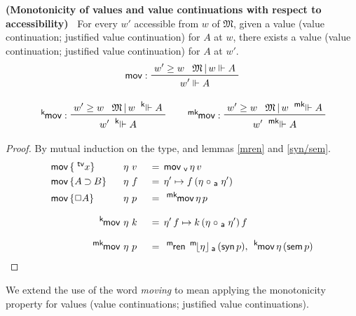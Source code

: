 \documentclass{entcs}
\numberwithin{equation}{thm}
\newcommand{\tsf}[1]{\textsf{\upshape{#1}}}
\newcommand{\stsf}[1]{\tsf{\small{#1}}}
\renewcommand{\:}{\mathrel{:}}
\newcommand{\tyrule}[1]{\prftree[l]{${#1} \:\,$}}
\newcommand{\0}{\varnothing}
\newcommand{\tvar}{\operatorname{^{\stsf{tv}\mkern-4mu}}}
\newcommand{\imp}{\mathbin{\supset}}
\newcommand{\sq}{\Box}
\newcommand{\mren}{\operatorname{^{\stsf{m}\mkern-2mu}\tsf{ren}}}
\newcommand{\M}{\mathfrak{M}}
\newcommand{\compa}{\mathrel{\circ_{\stsf{a}}}}
\newcommand{\movv}{\operatorname{\tsf{mov}_{\stsf{v}}}}
\newcommand{\mpeeka}[1]{\mathopen{^{\stsf{m}\mkern-3mu}\lfloor}{#1}\mathclose{\rfloor_{\mkern-2mu\stsf{a}}}}
\newcommand{\ee}{\mathrel{\Vdash}}
\newcommand{\kee}{\mathrel{^{\stsf{k}\mkern-6mu}\Vdash}}
\newcommand{\mkee}{\mathrel{^{\stsf{mk}\mkern-6mu}\Vdash}}
\newcommand{\syn}{\operatorname{\tsf{syn}}}
\newcommand{\sem}{\operatorname{\tsf{sem}}}
\newcommand{\mov}{\operatorname{\tsf{mov}}}
\newcommand{\kmov}{\operatorname{^{\stsf{k}\mkern-2mu}\tsf{mov}}}
\newcommand{\mkmov}{\operatorname{^{\stsf{mk}\mkern-2mu}\tsf{mov}}}
\begin{document}
\begin{lemma}
  \normalshape
  \textbf{(Monotonicity of values and value continuations with respect to accessibility)\ }
  \label{mov/kmov/mkmov}
  For every $w'$ accessible from $w$ of $\M$, given a value (value continuation; justified value continuation) for $A$ at $w$, there exists a value (value continuation; justified value continuation) for $A$ at $w'$.
  \begin{gather*}
    \tyrule{\mov}{w' \ge w}{\M\,|\, w \ee A}{w' \ee A}\\[0.5\baselineskip]
    \tyrule{\kmov}{w' \ge w}{\M\,|\, w \kee A}{w' \kee A}\qquad
    \tyrule{\mkmov}{w' \ge w}{\M\,|\, w \mkee A}{w' \mkee A}
  \end{gather*}
  \itshape
  \begin{proof}
    \normalshape
    By mutual induction on the type, and lemmas \ref{mren} and \ref{syn/sem}.
    \begin{alignat*}{3}
      & \rlap{$\mov\, \{\tvar x\}$}   &\,\eta\, &\,v \,&&=\, \movv \eta\, v\\
      & \rlap{$\mov\, \{A \imp B\}$}  &\,\eta\, &\,f \,&&=\, \eta' \mapsto f\, (\eta \compa \eta')\\
      & \rlap{$\mov\, \{\sq A\}$}     &\,\eta\, &\,p \,&&=\, \mkmov \eta\, p\\[0.5\baselineskip]
      && \qquad\quad \kmov             \,\eta\, &\,k \,&&=\, \eta'\, f \mapsto k\, (\eta \compa \eta')\, f\\[0.5\baselineskip]
      && \qquad\quad \mkmov            \,\eta\, &\,p \,&&=\, \mren\, \mpeeka{\eta}\, (\syn p),\, \kmov \eta\, (\sem p)
    \end{alignat*}
  \end{proof}
\end{lemma}

\noindent
We extend the use of the word \emph{moving} to mean applying the monotonicity property for values (value continuations; justified value continuations).
\end{document}
